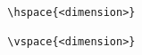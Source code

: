\documentclass{article}
\begin{document}
\begin{verbatim}
  \hspace{<dimension>}

  \vspace{<dimension>}
\end{verbatim}
\end{document}
